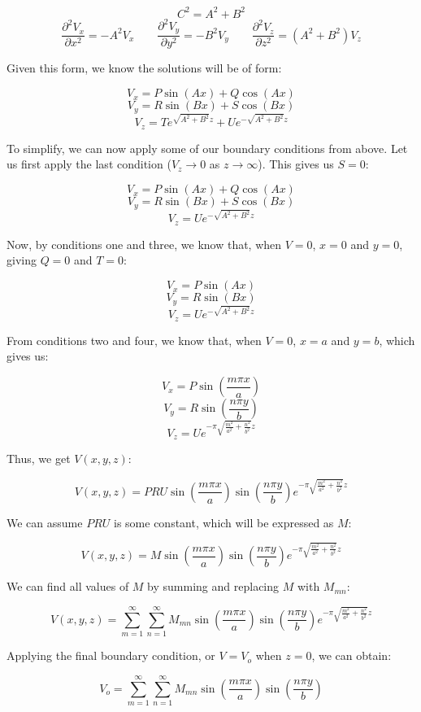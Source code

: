 \begin{enumerate}
        $$C^2=A^2+B^2$$
        $$\frac{\partial^2V_x}{\partial x^2}=-A^2V_x\quad\quad\frac{\partial^2V_y}{\partial y^2}=-B^2V_y\quad\quad\frac{\partial^2V_z}{\partial z^2}=(A^2+B^2)V_z$$

        Given this form, we know the solutions will be of form:

        $$V_x=P\sin(Ax)+Q\cos(Ax)$$
        $$V_y=R\sin(Bx)+S\cos(Bx)$$
        $$V_z=Te^{\sqrt{A^2+B^2}z}+Ue^{-\sqrt{A^2+B^2}z}$$

        To simplify, we can now apply some of our boundary conditions from above. Let us first apply the last condition ($V_z\to0$ as $z\to\infty$). This gives us $S=0$:

        $$V_x=P\sin(Ax)+Q\cos(Ax)$$
        $$V_y=R\sin(Bx)+S\cos(Bx)$$
        $$V_z=Ue^{-\sqrt{A^2+B^2}z}$$

        Now, by conditions one and three, we know that, when $V=0$, $x=0$ and $y=0$, giving $Q=0$ and $T=0$:

        $$V_x=P\sin(Ax)$$
        $$V_y=R\sin(Bx)$$
        $$V_z=Ue^{-\sqrt{A^2+B^2}z}$$

        From conditions two and four, we know that, when $V=0$, $x=a$ and $y=b$, which gives us:

        $$V_x=P\sin\left( \frac{m\pi x}{a} \right)$$
        $$V_y=R\sin\left( \frac{n\pi y}{b} \right)$$
        $$V_z=Ue^{-\pi\sqrt{\frac{m^2}{a^2}+\frac{n^2}{b^2}}z}$$

        Thus, we get $V(x,y,z)$:

        $$V(x,y,z)=PRU\sin\left( \frac{m\pi x}{a} \right)\sin\left( \frac{n\pi y}{b} \right)e^{-\pi\sqrt{\frac{m^2}{a^2}+\frac{n^2}{b^2}}z}$$

        We can assume $PRU$ is some constant, which will be expressed as $M$:

        $$V(x,y,z)=M\sin\left( \frac{m\pi x}{a} \right)\sin\left( \frac{n\pi y}{b} \right)e^{-\pi\sqrt{\frac{m^2}{a^2}+\frac{n^2}{b^2}}z}$$

        We can find all values of $M$ by summing and replacing $M$ with $M_{mn}$:

        $$V(x,y,z)=\sum_{m=1}^\infty\sum_{n=1}^\infty M_{mn}\sin\left( \frac{m\pi x}{a} \right)\sin\left( \frac{n\pi y}{b} \right)e^{-\pi\sqrt{\frac{m^2}{a^2}+\frac{n^2}{b^2}}z}$$

        Applying the final boundary condition, or $V=V_o$ when $z=0$, we can obtain:

        $$V_o=\sum_{m=1}^\infty\sum_{n=1}^\infty M_{mn}\sin\left( \frac{m\pi x}{a} \right)\sin\left( \frac{n\pi y}{b} \right)$$


\end{enumerate}
